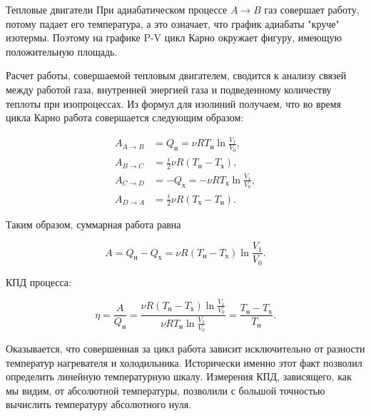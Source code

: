 \documentclass{article}
\begin{document}
\begin{section}{Тепловые двигатели}
		При адиабатическом процессе $A \to B$ газ совершает работу, потому падает его температура, а это означает, что график адиабаты "круче" изотермы. Поэтому на графике P-V цикл Карно окружает фигуру, имеющую положительную площадь.

		Расчет работы, совершаемой тепловым двигателем, сводится к анализу связей между работой газа, внутренней энергией газа и подведенному количеству теплоты при изопроцессах. Из формул для изолиний получаем, что во время цикла Карно работа совершается следующим образом:

		\begin{align*}
			A_{A \to B} &= Q_{\text{н}} = \nu R T_{\text{н}} \ln \frac{V_1}{V_0}, \\
			A_{B \to C} &= \frac{i}{2} \nu R (T_{\text{н}} - T_{\text{х}}), \\
			A_{C \to D} &= -Q_{\text{х}} = -\nu R T_{\text{х}} \ln \frac{V_1}{V_0}, \\
			A_{D \to A} &= \frac{i}{2} \nu R (T_{\text{х}} - T_{\text{н}}).
		\end{align*}

		Таким образом, суммарная работа равна

		\begin{equation*}
			A = Q_{\text{н}} - Q_{\text{х}} = \nu R \left( T_{\text{н}} - T_{\text{х}} \right) \ln \frac{V_1}{V_0}.
		\end{equation*}

		КПД процесса:

		\begin{equation*}
			\eta = \frac{A}{Q_{\text{н}}} = \frac{\nu R \left( T_{\text{н}} - T_{\text{х}} \right) \ln \frac{V_1}{V_0}}{\nu R T_{\text{н}} \ln \frac{V_1}{V_0}} = \frac{T_{\text{н}} - T_{\text{х}}}{T_{\text{н}}}.
		\end{equation*}

		Оказывается, что совершенная за цикл работа зависит исключительно от разности температур нагревателя и холодильника. Исторически именно этот факт позволил определить линейную температурную шкалу. Измерения КПД, зависящего, как мы видим, от абсолютной температуры, позволили с большой точностью вычислить температуру абсолютного нуля.
	\end{section}
\end{document}
